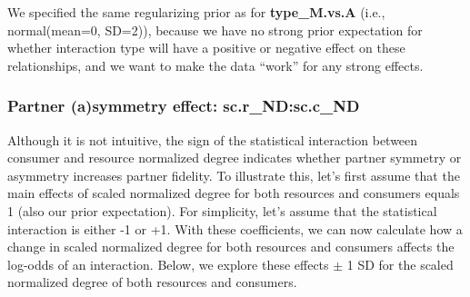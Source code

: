 \documentclass[11pt,]{article}
\begin{document}
We specified the same regularizing prior as for \textbf{type\_M.vs.A}
(i.e., normal(mean=0, SD=2)), because we have no strong prior
expectation for whether interaction type will have a positive or
negative effect on these relationships, and we want to make the data
``work'' for any strong effects.

\hypertarget{asymmetry-effect}{\subsubsection{Partner (a)symmetry
effect: sc.r\_ND:sc.c\_ND}\label{asymmetry-effect}}

Although it is not intuitive, the sign of the statistical interaction
between consumer and resource normalized degree indicates whether
partner symmetry or asymmetry increases partner fidelity. To illustrate
this, let's first assume that the main effects of scaled normalized
degree for both resources and consumers equals 1 (also our prior
expectation). For simplicity, let's assume that the statistical
interaction is either -1 or +1. With these coefficients, we can now
calculate how a change in scaled normalized degree for both resources
and consumers affects the log-odds of an interaction. Below, we explore
these effects \(\pm\) 1 SD for the scaled normalized degree of both
resources and consumers.
\end{document}
